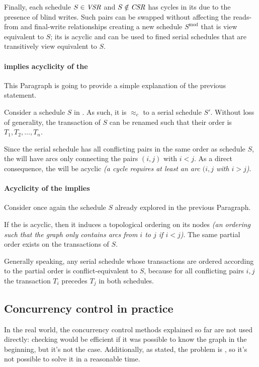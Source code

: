 \documentclass[english]{article}
\begin{document}
\bigskip
Finally, each schedule \(S \in \textit{VSR}\) and \(S \notin \textit{CSR}\) has cycles in its \CG due to the presence of blind writes.
Such pairs can be swapped without affecting the reads-from and final-write relationships creating a new schedule \(S^\text{mod}\) that is view equivalent to \(S\);
its \CG is acyclic and can be used to fined serial schedules that are transitively view equivalent to \(S\).

\paragraph{\CSR implies acyclicity of the \CG}

This Paragraph is going to provide a simple explanation of the previous statement.

Consider a schedule \(S\) in \CSR.
As such, it is \(\approx_c\) to a serial schedule \(S'\).
Without loss of generality, the transaction of \(S\) can be renamed such that their order is \(T_1, T_2, \dots, T_n\).

Since the serial schedule has all conflicting pairs in the same order as schedule \(S\), the \CG will have arcs only connecting the pairs \((i, j)\) with \(i < j\).
As a direct consequence, the \CG will be acyclic \textit{(a cycle requires at least an arc \((i, j\) with \(i > j\))}.

\paragraph{Acyclicity of the \CG implies \CSR}

Consider once again the schedule \(S\) already explored in the previous Paragraph.

If the \CG is acyclic, then it induces a topological ordering on its nodes \textit{(an ordering such that the graph only contains arcs from \(i\) to \(j\) if \(i < j\))}.
The same partial order exists on the transactions of \(S\).

Generally speaking, any serial schedule whose transactions are ordered according to the partial order is conflict-equivalent to \(S\), because for all conflicting pairs \(i, j\) the transaction \(T_i\) precedes \(T_j\) in both schedules.

\subsection{Concurrency control in practice}

In the real world, the concurrency control methods explained so far are not used directly: \CSR checking would be efficient if it was possible to know the graph in the beginning, but it's not the case.
Additionally, as stated, the problem is \NPC, so it's not possible to solve it in a reasonable time.
\end{document}

